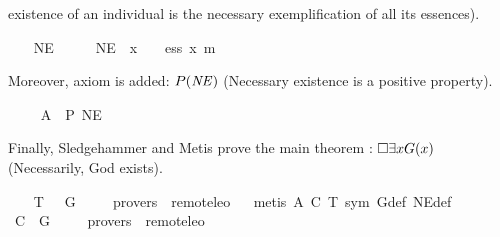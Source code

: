 \begin{isabellebody}
\begin{isamarkuptext}
existence of an individual is the necessary exemplification of all its essences).%
\end{isamarkuptext}%
\isamarkuptrue%
\ \ \isamarkupfalse%
\ NE\ {\isacharcolon}{\isacharcolon}\ {\isachardoublequoteopen}{\isasymmu}\ {\isasymRightarrow}\ {\isasymsigma}{\isachardoublequoteclose}\ \ {\isachardoublequoteopen}NE\ {\isacharequal}\ {\isacharparenleft}{\isasymlambda}x{\isachardot}\ {\isasymPi}\ {\isacharparenleft}{\isasymlambda}{\isasymPhi}{\isachardot}\ {\isasymPhi}\ ess\ x\ m{\isasymRightarrow}\ {\isasymbox}\ {\isacharparenleft}{\isasymexists}\ {\isasymPhi}{\isacharparenright}{\isacharparenright}{\isacharparenright}{\isachardoublequoteclose}%
\begin{isamarkuptext}%
Moreover, axiom  is added: $P(\mathit{NE})$ (Necessary existence is a positive 
property).%
\end{isamarkuptext}%
\isamarkuptrue%
\ \ \isamarkupfalse%
\ \ A{}{\isacharcolon}\ \ {\isachardoublequoteopen}{\isacharbrackleft}P\ NE{\isacharbrackright}{\isachardoublequoteclose}%
\begin{isamarkuptext}%
Finally, Sledgehammer and Metis prove the main theorem : $\Box \exists x G(x)$ 
(Necessarily, God exists).%
\end{isamarkuptext}%
\isamarkuptrue%
\ \ \isamarkupfalse%
\ T{}{\isacharcolon}\ {\isachardoublequoteopen}{\isacharbrackleft}{\isasymbox}\ {\isacharparenleft}{\isasymexists}\ G{\isacharparenright}{\isacharbrackright}{\isachardoublequoteclose}\ \isanewline
\ \ \isamarkupfalse%
\ {\isacharbrackleft}provers\ {\isacharequal}\ remote{\isacharunderscore}leo{}{\isacharbrackright}%
\isadelimproof
\ %
\endisadelimproof
%
\isatagproof
{}\isamarkupfalse%
\ {\isacharparenleft}metis\ A{}\ C\ T{}\ sym\ G{\isacharunderscore}def\ NE{\isacharunderscore}def{\isacharparenright}%
\endisatagproof
{\isafoldproof}%
%
\isadelimproof
%
\endisadelimproof
\isanewline
\isanewline
\ \ \isamarkupfalse%
\ C{}{\isacharcolon}\ {\isachardoublequoteopen}{\isacharbrackleft}{\isasymexists}\ G{\isacharbrackright}{\isachardoublequoteclose}\ \isanewline
\ \ \isamarkupfalse%
\ {\isacharbrackleft}provers\ {\isacharequal}\ remote{\isacharunderscore}leo{}{\isacharbrackright}%
\isadelimproof
\ %
\endisadelimproof
%
\isatagproof
{}\isamarkupfalse%

\end{isabellebody}
